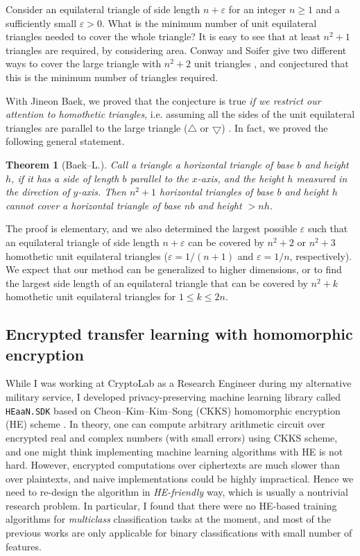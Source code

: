 \documentclass[12pt]{article}
\newtheorem*{theorem*}{Theorem}
\begin{document}
Consider an equilateral triangle of side length $n + \varepsilon$ for an integer $n \geq 1$ and a sufficiently small $\varepsilon > 0$.
What is the minimum number of unit equilateral triangles needed to cover the whole triangle?
It is easy to see that at least $n^2 + 1$ triangles are required, by considering area.
Conway and Soifer give two different ways to cover the large triangle with $n^2 + 2$ unit triangles \cite{conway2005covering}, and conjectured that this is the minimum number of triangles required.

With Jineon Baek, we proved that the conjecture is true \emph{if we restrict our attention to homothetic triangles}, i.e. assuming all the sides of the unit equilateral triangles are parallel to the large triangle ($\bigtriangleup$ or $\bigtriangledown$) \cite{baek2024n2}.
In fact, we proved the following general statement.

\begin{theorem*}[Baek--L.]
Call a triangle a horizontal triangle of base $b$ and height $h$, if it has a side of length $b$ parallel to the $x$-axis, and the height $h$ measured in the direction of $y$-axis.
Then $n^2 + 1$ horizontal triangles of base $b$ and height $h$ cannot cover a horizontal triangle of base $nb$ and height $> nh$.
\end{theorem*}

The proof is elementary, and we also determined the largest possible $\varepsilon$ such that an equilateral triangle of side length $n + \varepsilon$ can be covered by $n^2 + 2$ or $n^2 + 3$ homothetic unit equilateral triangles ($\varepsilon = 1/(n+1)$ and $\varepsilon = 1 / n$, respectively). 
We expect that our method can be generalized to higher dimensions, or to find the largest side length of an equilateral triangle that can be covered by $n^2 + k$ homothetic unit equilateral triangles for $1 \le k \le 2n$.

\subsection*{Encrypted transfer learning with homomorphic encryption}

While I was working at CryptoLab as a Research Engineer during my alternative military service, I developed privacy-preserving machine learning library called \texttt{HEaaN.SDK} \cite{heaansdk} based on Cheon--Kim--Kim--Song (CKKS) homomorphic encryption (HE) scheme \cite{cheon2017homomorphic}.
In theory, one can compute arbitrary arithmetic circuit over encrypted real and complex numbers (with small errors) using CKKS scheme, and one might think implementing machine learning algorithms with HE is not hard.
However, encrypted computations over ciphertexts are much slower than over plaintexts, and naive implementations could be highly impractical.
Hence we need to re-design the algorithm in \emph{HE-friendly} way, which is usually a nontrivial research problem.
In particular, I found that there were no HE-based training algorithms for \emph{multiclass} classification tasks at the moment, and most of the previous works are only applicable for binary classifications with small number of features.
\end{document}

